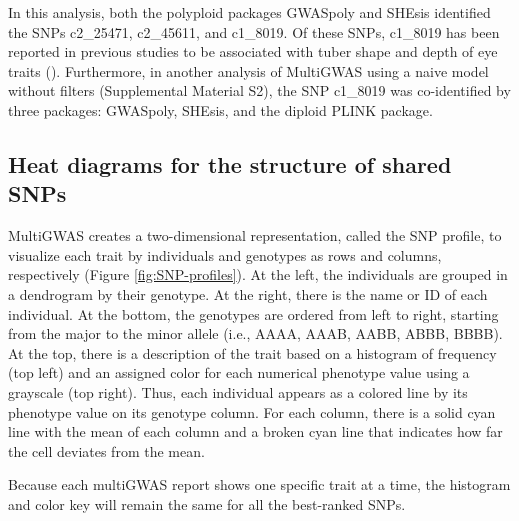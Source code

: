 \documentclass{article}
\begin{document}
In this analysis, both the polyploid packages GWASpoly and SHEsis identified the SNPs c2\_25471, c2\_45611, and c1\_8019. Of these SNPs, c1\_8019 has been reported in previous studies to be associated with tuber shape and depth of eye traits (\cite{Rosyara2016, Sharma2018}). Furthermore, in another analysis of MultiGWAS using a naive model without filters (Supplemental Material S2), the SNP c1\_8019 was co-identified by three packages: GWASpoly, SHEsis, and the diploid PLINK package.

\subsection{Heat diagrams for the structure of shared SNPs}

MultiGWAS creates a two-dimensional representation, called the SNP profile, to visualize each trait by individuals and genotypes as rows and columns, respectively (Figure \ref{fig:SNP-profiles}). At the left, the individuals are grouped in a dendrogram by their genotype. At the right, there is the name or ID of each individual. At the bottom, the genotypes are ordered from left to right, starting from the major to the minor allele (i.e., AAAA, AAAB, AABB, ABBB, BBBB). At the top, there is a description of the trait based on a histogram of frequency (top left) and an assigned color for each numerical phenotype value using a grayscale (top right). Thus, each individual appears as a colored line by its phenotype value on its genotype column. For each column, there is a solid cyan line with the mean of each column and a broken cyan line that indicates how far the cell deviates from the
mean.

Because each multiGWAS report shows one specific trait at a time, the histogram and color key will remain the same for all the best-ranked
SNPs.
\end{document}
